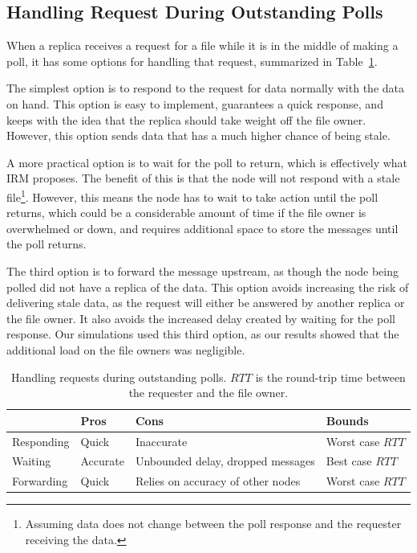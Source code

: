 \documentclass[10pt, conference, compsocconf, letterpaper]{IEEEtran} %
\begin{document}
\subsection{Handling Request During Outstanding Polls}
When a replica receives a request for a file while it is in the middle of making a poll, it has some options for handling that request, summarized in Table~\ref{choice}.  

The simplest option is to respond to the request for data normally with the data on hand.  This option is easy to implement, guarantees a quick response, and keeps with the idea that the replica should take weight off the file owner.  However, this option sends data that has a much higher chance of being stale.

A more practical option is to wait for the poll to return, which is effectively what IRM proposes.  The benefit of this is that the node will not respond with a stale file\footnote{Assuming data does not change between the poll response and the requester receiving the data.}.  However, this means the node has to wait to take action until the poll returns, which could be a considerable amount of time if the file owner is overwhelmed or down, and requires additional space to store the messages until the poll returns.


The third option is to forward the message upstream, as though the node being polled did not have a replica of the data. This option avoids increasing the risk of delivering stale data, as the request will either be answered by another replica or the file owner.  It also avoids the increased delay created by waiting for the poll response. Our simulations used this third option, as our results showed that the additional load on the file owners was negligible.

\begin{table}
    \centering
	\begin{tabular}{| l || l | p{2cm} | p{2cm}|} \hline	
				& Pros & Cons & Bounds \\ \hline 
	Responding & Quick & Inaccurate & Worst case $RTT$  \\ \hline
	Waiting    & Accurate & Unbounded delay, dropped messages& Best case  $RTT$   \\ \hline
	Forwarding & Quick& Relies on accuracy of other nodes & Worst case $RTT$  \\ \hline
	 

	\end{tabular}
	\caption{Handling requests during outstanding polls. $RTT$ is the round-trip time between the requester and the file owner.}
	\label{choice}
\end{table}
      
\end{document}
